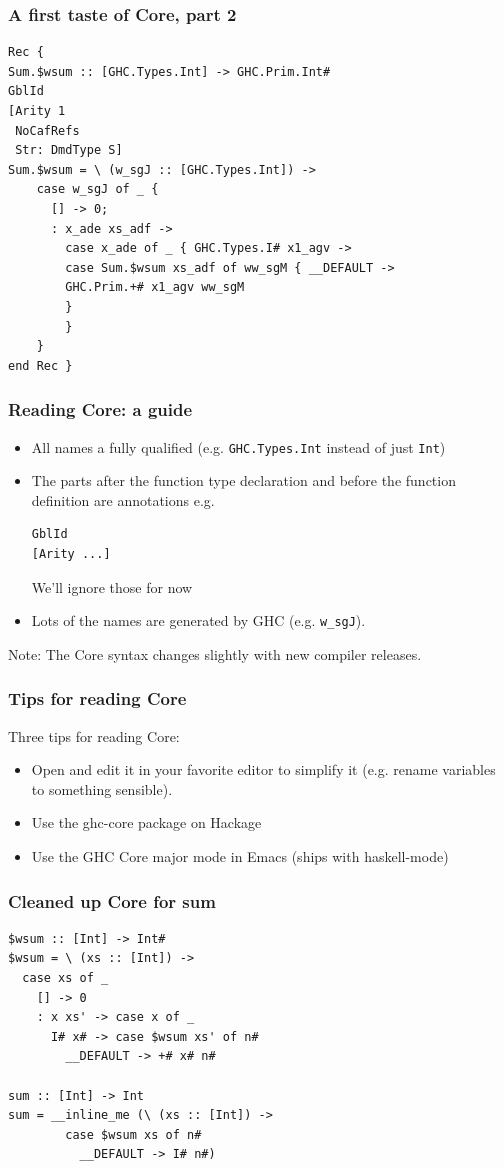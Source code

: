 \documentclass{beamer}
\begin{document}
\begin{frame}[fragile]
  \frametitle{A first taste of Core, part 2}
  \begin{verbatim}
Rec {
Sum.$wsum :: [GHC.Types.Int] -> GHC.Prim.Int#
GblId
[Arity 1
 NoCafRefs
 Str: DmdType S]
Sum.$wsum = \ (w_sgJ :: [GHC.Types.Int]) ->
    case w_sgJ of _ {
      [] -> 0;
      : x_ade xs_adf ->
        case x_ade of _ { GHC.Types.I# x1_agv ->
        case Sum.$wsum xs_adf of ww_sgM { __DEFAULT ->
        GHC.Prim.+# x1_agv ww_sgM
        }
        }
    }
end Rec }
  \end{verbatim}
\end{frame}

\begin{frame}[fragile]
  \frametitle{Reading Core: a guide}

  \begin{itemize}
  \item All names a fully qualified (e.g. \lstinline!GHC.Types.Int!
    instead of just \lstinline!Int!)
  \item The parts after the function type declaration and before the
    function definition are annotations e.g.
    \begin{lstlisting}
GblId
[Arity ...]
    \end{lstlisting}
    We'll ignore those for now
  \item Lots of the names are generated by GHC
    (e.g. \lstinline!w_sgJ!).
  \end{itemize}
  Note: The Core syntax changes slightly with new compiler releases.
\end{frame}

\begin{frame}
  \frametitle{Tips for reading Core}

  Three tips for reading Core:
  \begin{itemize}
  \item Open and edit it in your favorite editor to simplify it
    (e.g. rename variables to something sensible).
  \item Use the ghc-core package on Hackage
  \item Use the GHC Core major mode in Emacs (ships with haskell-mode)
  \end{itemize}
\end{frame}

\begin{frame}[fragile]
  \frametitle{Cleaned up Core for sum}

  \begin{verbatim}
$wsum :: [Int] -> Int#
$wsum = \ (xs :: [Int]) ->
  case xs of _
    [] -> 0
    : x xs' -> case x of _
      I# x# -> case $wsum xs' of n#
        __DEFAULT -> +# x# n#

sum :: [Int] -> Int
sum = __inline_me (\ (xs :: [Int]) ->
        case $wsum xs of n#
          __DEFAULT -> I# n#)
  \end{verbatim}
\end{frame}
\end{document}
